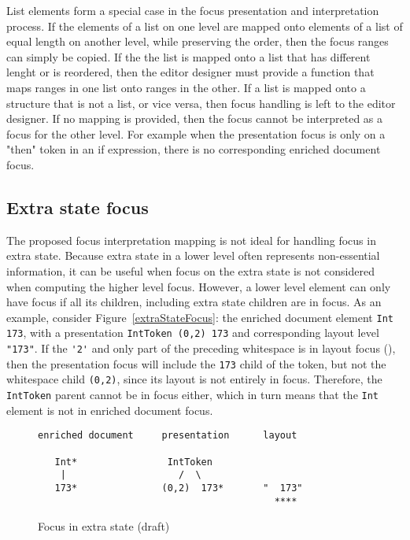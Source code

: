 List elements form a special case in the focus presentation and interpretation process. If the elements of a list on one level are mapped onto elements of a list of equal length on another level, while preserving the order, then the focus ranges can simply be copied. If the the list is mapped onto a list that has different lenght or is reordered, then the editor designer must provide a function that maps ranges in one list onto ranges in the other. If a list is mapped onto a structure that is not a list, or vice versa, then focus handling is left to the editor designer. If no mapping is provided, then the focus cannot be interpreted as a focus for the other level. For example when the presentation focus is only on a "then" token in an if expression, there is no corresponding enriched document focus.


%																
\subsection{Extra state focus}

The proposed focus interpretation mapping is not ideal for handling focus in extra state. Because extra state in a lower level often represents non-essential information, it can be useful when focus on the extra state is not considered when computing the higher level focus. However, a lower level element can only have focus if all its children, including extra state children are in focus. As an example, consider Figure~\ref{extraStateFocus}: the enriched document element \verb|Int 173|, with a presentation \verb|IntToken (0,2) 173| and corresponding layout level \verb|"|\textvisiblespace\textvisiblespace\verb|173"|. If the \verb|'2'| and only part of the preceding whitespace is in layout focus ({\tt \textvisiblespace{}}), then the presentation focus will include the \verb|173| child of the token, but not the whitespace child \verb|(0,2)|, since its layout is not entirely in focus. Therefore, the \verb|IntToken| parent cannot be in focus either, which in turn means that the \verb|Int| element is not in enriched document focus. 

\begin{figure}
\begin{small}
\begin{center}
\begin{verbatim}
enriched document     presentation      layout

   Int*                IntToken     
    |                    /  \    
   173*               (0,2)  173*       "  173"
                                          ****
\end{verbatim}
\caption{Focus in extra state (draft)}\label{extraStateFocusunpresentableFocus} 
\end{center}
\end{small}
\end{figure}

